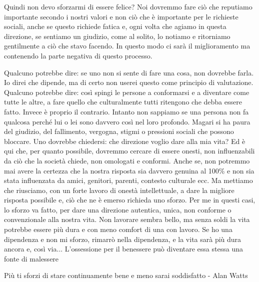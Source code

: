 \documentclass[12pt]{book} %
\begin{document}
Quindi non devo sforzarmi di essere felice? Noi dovremmo fare ciò che reputiamo importante secondo i nostri valori e non ciò che
è importante per le richieste sociali, anche se questo richiede fatica e, ogni volta che agiamo in questa direzione, se
sentiamo un giudizio, come al solito, lo notiamo e ritorniamo gentilmente a ciò che stavo facendo. In questo modo ci sarà il
miglioramento ma contenendo la parte negativa di questo processo. 

Qualcuno potrebbe dire: se uno non si sente di fare una cosa, non dovrebbe farla.
Io direi che dipende, ma di certo non userei questo come principio di valutazione.
Qualcuno potrebbe dire: così spingi le persone a conformarsi e a diventare come tutte le altre, a fare quello che culturalmente tutti ritengono che debba essere fatto. Invece è proprio il contrario.
Intanto non sappiamo se una persona non fa qualcosa perché lui o lei sono davvero così nel loro profondo. Magari si ha paura del giudizio, del fallimento, vergogna, stigmi o pressioni sociali che possono bloccare.
Uno dovrebbe chiedersi: che direzione voglio dare alla mia vita? Ed è qui che, per quanto possibile, dovremmo cercare di essere onesti, non influenzabili da ciò che la società chiede, non omologati e conformi. Anche se, non potremmo mai avere la certezza che la nostra risposta sia davvero genuina al 100\% e non sia stata influenzata da amici, genitori, parenti, contesto culturale ecc. Ma mettiamo che riusciamo, con un forte lavoro di onestà intellettuale, a dare la migliore risposta possibile e, ciò che ne è emerso richieda uno sforzo. Per me in questi casi, lo sforzo va fatto, per dare una direzione autentica, unica, non conforme o convenzionale alla nostra vita. 
Non lavorare sembra bello, ma senza soldi la vita potrebbe essere più dura e con meno comfort di una con lavoro. Se ho una dipendenza e non mi sforzo, rimarrò nella dipendenza, e la vita sarà più dura ancora e, così via...
L’ossessione per il benessere può diventare essa stessa una fonte di malessere

Più ti sforzi di stare continuamente bene e meno sarai soddisfatto - Alan Watts
\end{document}
